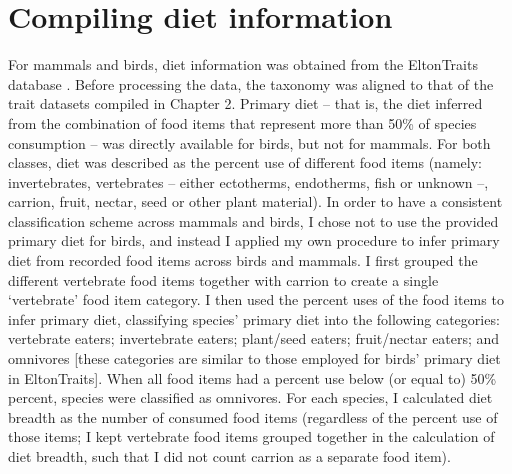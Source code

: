 \section{Compiling diet information}

For mammals and birds, diet information was obtained from the EltonTraits database \citep{Wilman2014}. Before processing the data, the taxonomy was aligned to that of the trait datasets compiled in Chapter 2. Primary diet -- that is, the diet inferred from the combination of food items that represent more than 50\% of species consumption -- was directly available for birds, but not for mammals. For both classes, diet was described as the percent use of different food items (namely: invertebrates, vertebrates -- either ectotherms, endotherms, fish or unknown --, carrion, fruit, nectar, seed or other plant material). In order to have a consistent classification scheme across mammals and birds, I chose not to use the provided primary diet for birds, and instead I applied my own procedure to infer primary diet from recorded food items across birds and mammals. I first grouped the different vertebrate food items together with carrion to create a single `vertebrate' food item category. I then used the percent uses of the food items to infer primary diet, classifying species’ primary diet into the following categories: vertebrate eaters; invertebrate eaters; plant/seed eaters; fruit/nectar eaters; and omnivores [these categories are similar to those employed for birds' primary diet in EltonTraits]. When all food items had a percent use below (or equal to) 50\% percent, species were classified as omnivores. %
 For each species, I calculated diet breadth as the number of consumed food items (regardless of the percent use of those items; I kept vertebrate food items grouped together in the calculation of diet breadth, such that I did not count carrion as a separate food item). %


